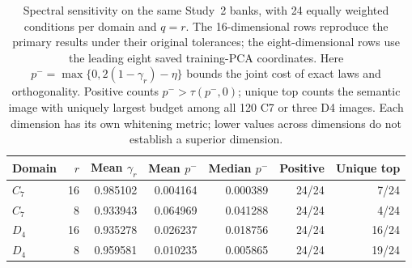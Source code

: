 \begin{table}[htbp]
\caption{Spectral sensitivity on the same Study~2 banks, with 24 equally weighted conditions per domain and $q=r$. The 16-dimensional rows reproduce the primary results under their original tolerances; the eight-dimensional rows use the leading eight saved training-PCA coordinates. Here $p^-=\max\{0,2(1-\gamma_r)-\eta\}$ bounds the joint cost of exact laws and orthogonality. Positive counts $p^->\tau(p^-,0)$; unique top counts the semantic image with uniquely largest budget among all 120 C7 or three D4 images. Each dimension has its own whitening metric; lower values across dimensions do not establish a superior dimension.}
\label{tab:spectral-dimension-sensitivity}
\centering\small
\setlength{\tabcolsep}{3pt}
\begin{tabular}{@{}lrrrrrr@{}}
\toprule
Domain & $r$ & Mean $\gamma_r$ & Mean $p^-$ & Median $p^-$ & Positive & Unique top \\
\midrule
$C_7$ & 16 & 0.985102 & 0.004164 & 0.000389 & 24/24 & 7/24 \\
$C_7$ & 8 & 0.933943 & 0.064969 & 0.041288 & 24/24 & 4/24 \\
\addlinespace
$D_4$ & 16 & 0.935278 & 0.026237 & 0.018756 & 24/24 & 16/24 \\
$D_4$ & 8 & 0.959581 & 0.010235 & 0.005865 & 24/24 & 19/24 \\
\bottomrule
\end{tabular}
\end{table}

